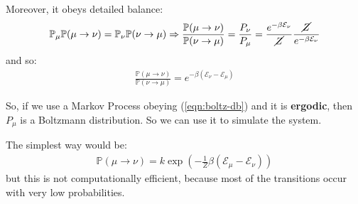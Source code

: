 \documentclass[../template.tex]{subfiles}
\begin{document}
\medskip

Moreover, it obeys detailed balance:
\begin{align*}
    \mathbb{P}_\mu \mathbb{P}(\mu \to \nu) = \mathbb{P}_\nu \mathbb{P}(\nu \to \mu) \Rightarrow \frac{\mathbb{P}(\mu \to \nu)}{\mathbb{P}(\nu \to \mu)}  = \frac{P_\nu}{P_\mu} = \frac{e^{- \beta \mathcal{E}_\nu}}{\cancel{Z}} \frac{\cancel{Z}}{e^{-\beta \mathcal{E}_\nu}}   
\end{align*}
and so:
\begin{align}\label{eqn:boltz-db}
    \frac{\mathbb{P}(\mu \to \nu)}{\mathbb{P}(\nu \to \mu)} = e^{- \beta (\mathcal{E}_\nu - \mathcal{E}_\mu)}  
\end{align}

So, if we use a Markov Process obeying (\ref{eqn:boltz-db}) and it is \textbf{ergodic}, then $P_\mu$ is a Boltzmann distribution. So we can use it to simulate the system.  

\begin{comment}
\begin{figure}[hbp]
    \centering
    \begin{tikzpicture}[shorten >=1pt,node distance=2cm,auto]
        \tikzstyle{every state}=[fill={rgb:black,1;white,10},font=\bfseries]
        \tikzset{every loop/.style={min distance=4mm,looseness=4}}
        \node[state] (q0) {0};
        \node[state, above right of=q0] (q1) {1};
        \node[state, below right of=q1] (q2) {2};
        \node[state, below right of=q2] (q3) {3};
        \node[state, below left of=q3] (q4) {4};
        \node[state, below right of=q0] (q5) {5};
        \path[->]
        (q0) edge [above left] node{$1$} (q1)
        (q1) edge [above] node{$1$} (q2)
        (q2) edge [above right] node{$1$} (q3)
        (q3) edge [below right] node{$1$} (q4)
        (q4) edge [below] node{$1$} (q5)
        (q5) edge [below left] node{$1$} (q0);
    \end{tikzpicture}
    \caption{Block diagram for a $N=6$ cyclic Markov chain}
    \label{fig:block-N}
\end{figure}
\end{comment}

The simplest way would be:
\begin{align*}
    \mathbb{P}(\mu \to \nu) = k \exp\left(-\frac{1}{Z} \beta(\mathcal{E}_\mu - \mathcal{E}_\nu) \right)
\end{align*}
but this is not computationally efficient, because most of the transitions occur with very low probabilities. 
\end{document}
